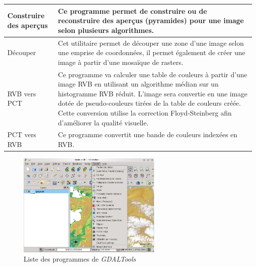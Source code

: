 {\begin{longtable}{|p{3cm}|p{13cm}|}
\hline Construire des aperçus & Ce programme permet de construire ou de reconstruire des aperçus (pyramides) pour une image selon plusieurs algorithmes.\\
\hline Découper & Cet utilitaire permet de découper une zone d'une image selon une emprise de coordonnées, il permet également de créer une image à partir d'une mosaïque de rasters. \\
\hline RVB vers PCT & Ce programme va calculer une table de couleurs à partir d'une image RVB en utilisant un algorithme médian sur un histogramme RVB réduit. L'image sera convertie en une image dotée de pseudo-couleurs tirées de la table de couleurs créée. Cette conversion utilise la correction Floyd-Steinberg afin d'améliorer la qualité visuelle. \\
PCT vers RVB & Ce programme convertit une bande de couleurs indexées en RVB.\\
\end{longtable}

\begin{figure}[ht]
   \centering
   \caption{Liste des programmes de \emph{GDALTools} \nixcaption}\label{gdaltools_menu}
   \includegraphics[clip=true, width=7cm]{plugins_gdaltools_images/raster_menu}
\end{figure}

}

